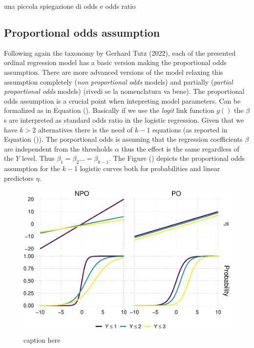 \documentclass[
  man,floatsintext]{apa6}
\begin{document}
una piccola spiegazione di odds e odds ratio

\subsection{Proportional odds assumption}\label{proportional-odds-assumption}

Following again the taxonomy by Gerhard Tutz (2022), each of the presented ordinal regression model has a basic version making the proportional odds assumption. There are more advanced versions of the model relaxing this assumption completely (\emph{non proportional odds} models) and partially (\emph{partial proportional odds} models) (rivedi se la nomenclatura va bene). The proportional odds assumption is a crucial point when intepreting model parameters. Can be formalized as in Equation (). Basically if we use the \emph{logit} link function \(g()\) the \(\beta\)s are interpreted as standard odds ratio in the logistic regression. Given that we have \(k > 2\) alternatives there is the need of \(k - 1\) equations (as reported in Equation ()). The porportional odds is assuming that the regression coefficients \(\beta\) are independent from the thresholds \(\alpha\) thus the effect is the same regardless of the \(Y\) level. Thus \(\beta_1 = \beta_2 \dots = \beta_{k - 1}\). The Figure () depicts the proportional odds assumption for the \(k - 1\) logistic curves both for probabilities and linear predictors \(\eta\).

\scriptsize

\begin{figure}

{\centering \includegraphics{paper-new_files/figure-latex/fig-prop-odds-1} 

}

\caption{caption here}\label{fig:fig-prop-odds}
\end{figure}
\end{document}
